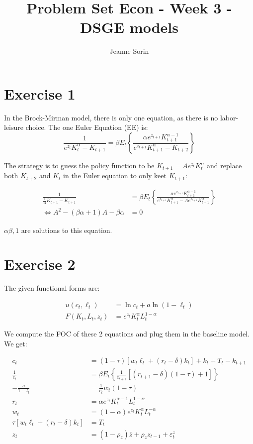 \documentclass[11pt]{article}
\title{Problem Set Econ - Week 3 - DSGE models}
\author{Jeanne Sorin}
\numberwithin{equation}{section}
\theoremstyle{plain}
\theoremstyle{definition}
\def\bic{\Leftrightarrow}
\newcommand{\1}{\mathbbm 1}
\def\a{\alpha}
\def\b{\beta}
\newcommand{\e}{\varepsilon}
\begin{document}
\maketitle



\section*{Exercise 1}
In the Brock-Mirman model, there is only one equation, as there is no labor-leisure choice. The one Euler Equation (EE) is:
\begin{equation}
\frac{1}{e^{z_{t}} K_{t}^{\alpha}-K_{t+1}}=\beta E_{t}\left\{\frac{\alpha e^{z_{t+1}} K_{t+1}^{\alpha-1}}{e^{z_{t+1}} K_{t+1}^{\alpha}-K_{t+2}}\right\}
\end{equation}

\noindent The strategy is to guess the policy function to be $ K_{t+1}=A e^{z_{t}} K_{t}^{\alpha} $ and replace both $K_{t+2}$ and $K_{t}$ in the Euler equation to only keet $K_{t+1}$:

\begin{align}
\frac{1}{\frac{1}{A}K_{t+1}-K_{t+1}}&=\beta E_{t}\left\{\frac{\alpha e^{z_{t+1}} K_{t+1}^{\alpha-1}}{e^{z_{t+1}} K_{t+1}^{\alpha}-A e^{z_{t+1}} K_{t+1}^{\alpha}}\right\} \\
\bic A^2 - (\b \a + 1) A - \b \a &= 0
\end{align}

${\a \b, 1}$ are solutions to this equation.



\section*{Exercise 2}

The given functional forms are:

\begin{align} 
u\left(c_{t}, \ell_{t}\right) &=\ln c_{t}+a \ln \left(1-\ell_{t}\right) \\ 
F\left(K_{t}, L_{t}, z_{t}\right) &=e^{z_{t}} K_{t}^{\alpha} L_{t}^{1-\alpha} 
\end{align}

We compute the FOC of these 2 equations and plug them in the baseline model. We get:

\begin{align}
c_{t}&=(1-\tau)\left[w_{t} \ell_{t}+\left(r_{t}-\delta\right) k_{t}\right]+k_{t}+T_{t}-k_{t+1} \\
\frac{1}{c_t}&=\beta E_{t}\left\{\frac{1}{c_{t+1}}\left[\left(r_{t+1}-\delta\right)(1-\tau)+1\right]\right\} \\
-\frac{a}{1-l_t}&=\frac{1}{c_t} w_{t}(1-\tau) \\
r_{t}&=\a e^{z_{t}} K_{t}^{\alpha-1} L_{t}^{1-\alpha} \\
w_{t}&=(1 - \a) e^{z_{t}} K_{t}^{\alpha} L_{t}^{-\alpha} \\
\tau\left[w_{t} \ell_{t}+\left(r_{t}-\delta\right) k_{t}\right]&=T_{t}\\
z_t&= (1 - \rho_z) \overline{z} + \rho_z z_{t-1} + \e_t^{z}
\end{align}
\end{document}
